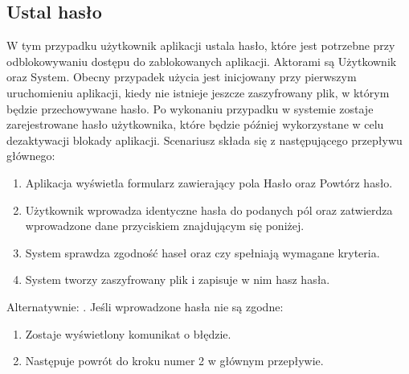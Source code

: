 \subsection{Ustal hasło}
W tym przypadku użytkownik aplikacji ustala hasło, które jest potrzebne przy odblokowywaniu dostępu do zablokowanych aplikacji. Aktorami są Użytkownik oraz System. Obecny przypadek użycia jest inicjowany przy pierwszym uruchomieniu aplikacji, kiedy nie istnieje jeszcze zaszyfrowany plik, w którym będzie przechowywane hasło. Po wykonaniu przypadku w systemie zostaje zarejestrowane hasło użytkownika, które będzie później wykorzystane w celu dezaktywacji blokady aplikacji. Scenariusz składa się z następującego przepływu głównego:
\begin{enumerate}
    \item Aplikacja wyświetla formularz zawierający pola Hasło oraz Powtórz hasło.
    \item Użytkownik wprowadza identyczne hasła do podanych pól oraz zatwierdza wprowadzone dane przyciskiem znajdującym się poniżej.
    \item System sprawdza zgodność haseł oraz czy spełniają wymagane kryteria.
    \item System tworzy zaszyfrowany plik i zapisuje w nim hasz hasła.
\end{enumerate}
Alternatywnie:
\newline\newline
{}. Jeśli wprowadzone hasła nie są zgodne:
\begin{enumerate}[leftmargin=3\parindent]
    \item Zostaje wyświetlony komunikat o błędzie.
    \item Następuje powrót do kroku numer 2 w głównym przepływie.
\end{enumerate}


